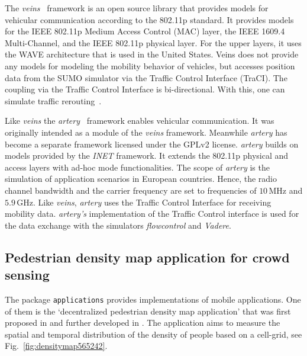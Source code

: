 \newpage



The \textit{{veins}}~\cite{sommer-2011-com} framework is an open source library that provides models for vehicular communication according to the 802.11p standard. It provides models for the IEEE 802.11p Medium Access Control (MAC) layer, the IEEE 1609.4 Multi-Channel, and the IEEE 802.11p physical layer. For the upper layers, it uses the WAVE architecture that is used in the United States. Veins does not provide any models for modeling the mobility behavior of vehicles, but accesses position data from the SUMO simulator via the Traffic Control Interface (TraCI). The coupling via the Traffic Control Interface is bi-directional. With this, one can simulate traffic rerouting~\cite[p.218]{virdis-2019-com}.


Like \textit{veins} the \textit{{artery}}~\cite{riebl-2015-com,riebl-2019-com} framework enables vehicular communication. It was originally intended as a module of the \textit{veins} framework. Meanwhile \textit{artery} has become a separate framework licensed under the GPLv2 license. \textit{artery} builds on models provided by the \textit{INET} framework. It extends the 802.11p physical and access layers with ad-hoc mode functionalities. The scope of \textit{artery} is the simulation of application scenarios in European countries. Hence, the radio channel bandwidth and the carrier frequency are set to frequencies of $10\,\text{MHz}$ and $5.9\,\text{GHz}$. Like \textit{veins}, \textit{artery}  uses the Traffic Control Interface for receiving mobility data. \textit{artery's} implementation of the Traffic Control interface is used for the data exchange with the simulators \textit{flowcontrol} and \textit{Vadere}.





\subsection{Pedestrian density map application for crowd sensing}
\label{sec:novelapplication}

The package \lstinline{applications} provides implementations of mobile applications. One of them is the `decentralized pedestrian density map application' that was first proposed in \cite{schuhbaeck-2021-com} and further developed in \cite{schuhbaeck-2023-com}. The application aims to measure the spatial and temporal distribution of the density of people based on a cell-grid, see Fig.~\ref{fig:densitymap565242}.

